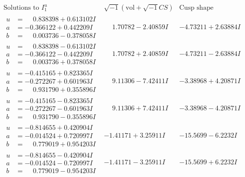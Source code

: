 \documentclass[1p]{elsarticle_modified}
\theoremstyle{definition}
\newcommand{\I}{\sqrt{-1}}
\begin{document}
$$\begin{array}{c|c|c}  
\text{Solutions to }I^u_{1}& \I (\text{vol} + \sqrt{-1}CS) & \text{Cusp shape}\\
 \hline 
\begin{aligned}
u &= \phantom{-}0.838398 + 0.613102 I \\
a &= -0.366122 + 0.442209 I \\
b &= \phantom{-}0.003736 - 0.378058 I\end{aligned}
 & \phantom{-}1.70782 - 2.40859 I & -4.73211 + 2.63884 I \\ \hline\begin{aligned}
u &= \phantom{-}0.838398 - 0.613102 I \\
a &= -0.366122 - 0.442209 I \\
b &= \phantom{-}0.003736 + 0.378058 I\end{aligned}
 & \phantom{-}1.70782 + 2.40859 I & -4.73211 - 2.63884 I \\ \hline\begin{aligned}
u &= -0.415165 + 0.823365 I \\
a &= -0.272267 + 0.601963 I \\
b &= \phantom{-}0.931790 + 0.355896 I\end{aligned}
 & \phantom{-}9.11306 - 7.42411 I & -3.38968 + 4.20871 I \\ \hline\begin{aligned}
u &= -0.415165 - 0.823365 I \\
a &= -0.272267 - 0.601963 I \\
b &= \phantom{-}0.931790 - 0.355896 I\end{aligned}
 & \phantom{-}9.11306 + 7.42411 I & -3.38968 - 4.20871 I \\ \hline\begin{aligned}
u &= -0.814655 + 0.420904 I \\
a &= -0.014524 + 0.720997 I \\
b &= \phantom{-}0.779019 + 0.954203 I\end{aligned}
 & -1.41171 + 3.25911 I & -15.5699 - 6.2232 I \\ \hline\begin{aligned}
u &= -0.814655 - 0.420904 I \\
a &= -0.014524 - 0.720997 I \\
b &= \phantom{-}0.779019 - 0.954203 I\end{aligned}
 & -1.41171 - 3.25911 I & -15.5699 + 6.2232 I \\ \hline\begin{aligned}

\end{aligned}
\end{array}$$
\end{document}
